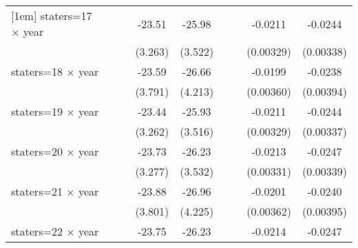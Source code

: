 {\begin{longtable}{l*{8}{c}}
[1em]
staters=17 $\times$ year&                     &                     &      -23.51\sym{***}&      -25.98\sym{***}&                     &                     &     -0.0211\sym{***}&     -0.0244\sym{***}\\
                    &                     &                     &     (3.263)         &     (3.522)         &                     &                     &   (0.00329)         &   (0.00338)         \\
[1em]
staters=18 $\times$ year&                     &                     &      -23.59\sym{***}&      -26.66\sym{***}&                     &                     &     -0.0199\sym{***}&     -0.0238\sym{***}\\
                    &                     &                     &     (3.791)         &     (4.213)         &                     &                     &   (0.00360)         &   (0.00394)         \\
[1em]
staters=19 $\times$ year&                     &                     &      -23.44\sym{***}&      -25.93\sym{***}&                     &                     &     -0.0211\sym{***}&     -0.0244\sym{***}\\
                    &                     &                     &     (3.262)         &     (3.516)         &                     &                     &   (0.00329)         &   (0.00337)         \\
[1em]
staters=20 $\times$ year&                     &                     &      -23.73\sym{***}&      -26.23\sym{***}&                     &                     &     -0.0213\sym{***}&     -0.0247\sym{***}\\
                    &                     &                     &     (3.277)         &     (3.532)         &                     &                     &   (0.00331)         &   (0.00339)         \\
[1em]
staters=21 $\times$ year&                     &                     &      -23.88\sym{***}&      -26.96\sym{***}&                     &                     &     -0.0201\sym{***}&     -0.0240\sym{***}\\
                    &                     &                     &     (3.801)         &     (4.225)         &                     &                     &   (0.00362)         &   (0.00395)         \\
[1em]
staters=22 $\times$ year&                     &                     &      -23.75\sym{***}&      -26.23\sym{***}&                     &                     &     -0.0214\sym{***}&     -0.0247\sym{***}\\

\end{longtable}}
